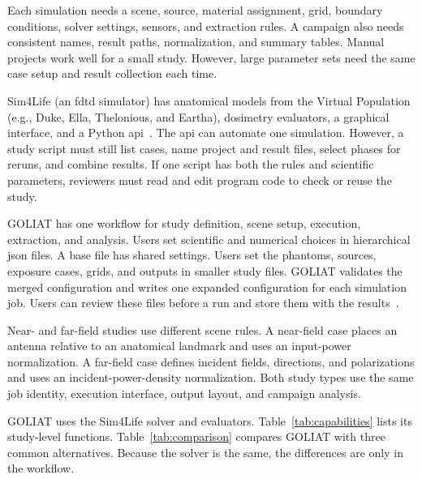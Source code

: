 \documentclass[final,5p,times,twocolumn]{elsarticle}
\begin{document}
Each simulation needs a scene, source, material assignment, grid, boundary conditions, solver settings, sensors, and extraction rules. A campaign also needs consistent names, result paths, normalization, and summary tables. Manual projects work well for a small study. However, large parameter sets need the same case setup and result collection each time.

Sim4Life (an \gls{fdtd} simulator) has anatomical models from the Virtual Population (e.g., Duke, Ella, Thelonious, and Eartha), dosimetry evaluators, a graphical interface, and a Python \gls{api}~\cite{Gosselin2014,Sim4Life}. The \gls{api} can automate one simulation. However, a study script must still list cases, name project and result files, select phases for reruns, and combine results. If one script has both the rules and scientific parameters, reviewers must read and edit program code to check or reuse the study.

GOLIAT has one workflow for study definition, scene setup, execution, extraction, and analysis. Users set scientific and numerical choices in hierarchical \gls{json} files. A base file has shared settings. Users set the phantoms, sources, exposure cases, grids, and outputs in smaller study files. GOLIAT validates the merged configuration and writes one expanded configuration for each simulation job. Users can review these files before a run and store them with the results~\cite{Sandve2013,Wilson2014}.

Near- and far-field studies use different scene rules. A near-field case places an antenna relative to an anatomical landmark and uses an input-power normalization. A far-field case defines incident fields, directions, and polarizations and uses an incident-power-density normalization. Both study types use the same job identity, execution interface, output layout, and campaign analysis.

GOLIAT uses the Sim4Life solver and evaluators. Table~\ref{tab:capabilities} lists its study-level functions. Table~\ref{tab:comparison} compares GOLIAT with three common alternatives. Because the solver is the same, the differences are only in the workflow.
\end{document}
